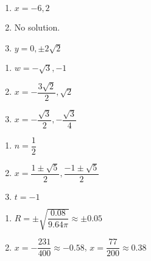 \begin{multicols}{3}
\begin{enumerate}
\setcounter{enumi}{\value{HW}}


\item $x=-6, 2$
\item No solution.
\item $y = 0, \pm 2\sqrt{2}$  

\setcounter{HW}{\value{enumi}}
\end{enumerate}
\end{multicols}

\begin{multicols}{3}
\begin{enumerate}
\setcounter{enumi}{\value{HW}}


\item $w = -\sqrt{3}, -1$
\item $x = -\dfrac{3\sqrt{2}}{2}, \sqrt{2}$
\item $x = -\dfrac{\sqrt{3}}{2}, -\dfrac{\sqrt{3}}{4}$

\setcounter{HW}{\value{enumi}}
\end{enumerate}
\end{multicols}


\begin{multicols}{3}
\begin{enumerate}
\setcounter{enumi}{\value{HW}}

\item $n = \dfrac{1}{2}$
\item $x = \dfrac{1 \pm \sqrt{5}}{2}, \dfrac{-1 \pm \sqrt{5}}{2}$
\item $t = -1$

\setcounter{HW}{\value{enumi}}
\end{enumerate}
\end{multicols}


\begin{multicols}{2}
\begin{enumerate}
\setcounter{enumi}{\value{HW}}


\item $R = \pm \sqrt{\dfrac{0.08}{9.64 \pi}} \approx \pm 0.05$ 
\item $x = -\dfrac{231}{400} \approx -0.58$, $x = \dfrac{77}{200} \approx 0.38$ 


\setcounter{HW}{\value{enumi}}
\end{enumerate}
\end{multicols}

